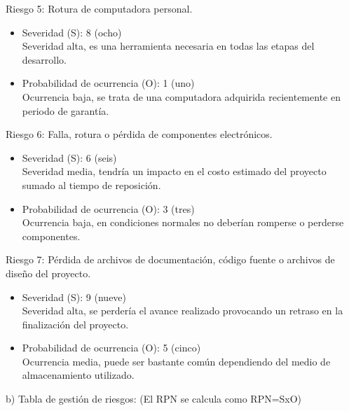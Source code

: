 \documentclass[11pt]{charter}
\begin{document}
Riesgo 5: Rotura de computadora personal.
\begin{itemize}
\item Severidad (S): 8 (ocho) \\
Severidad alta, es una herramienta necesaria en todas las etapas del desarrollo.
\item Probabilidad de ocurrencia (O): 1 (uno) \\
Ocurrencia baja, se trata de una computadora adquirida recientemente en periodo de garantía.
\end{itemize}

Riesgo 6: Falla, rotura o pérdida de componentes electrónicos.
\begin{itemize}
\item Severidad (S): 6 (seis) \\
Severidad media, tendría un impacto en el costo estimado del proyecto sumado al tiempo de reposición.
\item Probabilidad de ocurrencia (O): 3 (tres) \\
Ocurrencia baja, en condiciones normales no deberían romperse o perderse componentes.
\end{itemize}

Riesgo 7: Pérdida de archivos de documentación, código fuente o archivos de diseño del proyecto.
\begin{itemize}
\item Severidad (S): 9 (nueve) \\
Severidad alta, se perdería el avance realizado provocando un retraso en la finalización del proyecto.
\item Probabilidad de ocurrencia (O): 5 (cinco) \\
Ocurrencia media, puede ser bastante común dependiendo del medio de almacenamiento utilizado.
\end{itemize}

\newpage

b) Tabla de gestión de riesgos: \hfill (El RPN se calcula como RPN=SxO)
\end{document}
